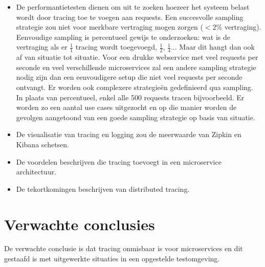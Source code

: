 \documentclass[fleqn,10pt]{voorstel}
\begin{document}
\begin{itemize}
\item De performantietesten dienen om uit te zoeken hoezeer het systeem belast wordt door tracing toe te voegen aan requests. Een succesvolle sampling strategie zou niet voor merkbare vertraging mogen zorgen ($<2$\% vertraging). Eenvoudige sampling is percentueel gewijs te onderzoeken: wat is de vertraging als er $\frac{1}{1}$ tracing wordt toegevoegd, $\frac{1}{2}$, $\frac{1}{4}$... 
Maar dit hangt dan ook af van situatie tot situatie. Voor een drukke webservice met veel requests per seconde en veel verschillende microservices zal een andere sampling strategie nodig zijn dan een eenvoudigere setup die niet veel requests per seconde ontvangt. Er worden ook complexere strategieën gedefinieerd qua sampling. In plaats van percentueel, enkel alle 500 requests tracen bijvoorbeeld. Er worden zo een aantal use cases uitgezocht en op die manier worden de gevolgen aangetoond van een goede sampling strategie op basis van situatie.
\item De visualisatie van tracing en logging zou de meerwaarde van Zipkin en Kibana schetsen.
\item De voordelen beschrijven die tracing toevoegt in een microservice architectuur.
\item De tekortkomingen beschrijven van distributed tracing.
\end{itemize}

\section{Verwachte conclusies}
\label{sec:verwachte_conclusies}

De verwachte conclusie is dat tracing onmisbaar is voor microservices en dit gestaafd is met uitgewerkte situaties in een opgestelde testomgeving. \\


\printbibliography[heading=bibintoc]
\end{document}
